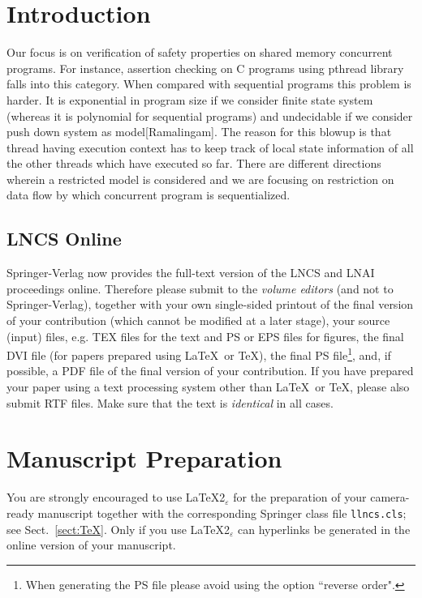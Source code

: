 \documentclass[runningheads]{llncs}
\begin{document}
\section{Introduction}
Our focus is on verification of safety properties on shared memory concurrent programs. For instance, assertion checking on C programs using pthread library falls into this category. When compared with sequential programs this problem is harder. It is exponential in program size if we consider finite state system (whereas it is polynomial for sequential programs) and undecidable if we consider push down system as model[Ramalingam]. The reason for this blowup is that thread having execution context has to keep track of local state information of all the other threads which have executed so far. There are different directions wherein a restricted model is considered and we are focusing on restriction on data flow by which concurrent program is sequentialized. 

\subsection{LNCS Online}
\label{sect:lncs_online}

Springer-Verlag now provides the full-text version of
the LNCS and LNAI proceedings online. Therefore please
submit to the {\it volume editors} (and not to Springer-Verlag),
together
with your own single-sided printout of the final version of your
contribution (which cannot be modified at a later stage), your source
(input) files, e.g. TEX files for the text
and PS or EPS files for figures, the final DVI file (for papers prepared
using \LaTeX\ or \TeX), the final
PS file\footnote{When generating the PS file please avoid using the
option ``reverse order".}, and, if possible, a PDF file of the final
version of your contribution.
If you have prepared your paper using a text processing system other
than \LaTeX\ or \TeX, please also submit RTF files.
Make sure that the text is {\em identical} in all cases.


\section{Manuscript Preparation}

You are strongly encouraged to use \LaTeX2$_\varepsilon$ for the
preparation of your
camera-ready manuscript together with the corresponding Springer
class file \verb+llncs.cls+;
see Sect.~\ref{sect:TeX}. Only if you use \LaTeX2$_\varepsilon$ can
hyperlinks be generated in the online version of your manuscript.
\end{document}
